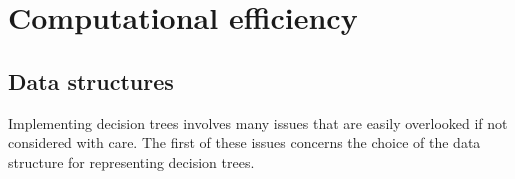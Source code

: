 \chapter{Computational efficiency}\label{ch:complexity}






\section{Data structures}

Implementing decision trees involves many issues that are easily overlooked if
not considered with care. The first of these issues concerns the choice of the
data structure for representing decision trees.

